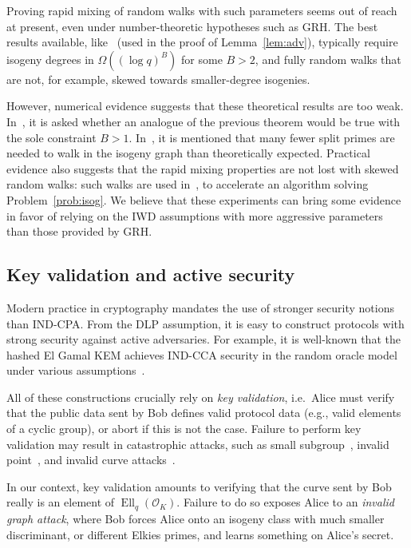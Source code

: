 \documentclass{llncs}
\renewcommand{\O}{\mathcal{O}}
\DeclareMathOperator{\Ell}{Ell}
\begin{document}
Proving rapid mixing of random walks with such
parameters seems out of reach at present, even under number-theoretic
hypotheses such as GRH. The best results available,
like~\cite[Theorem~1.5]{jao+miller+venkatesan09}
(used in the proof of Lemma~\ref{lem:adv}),
typically require isogeny degrees in $\Omega((\log q)^B)$
for some $B>2$, and fully random walks that are not,
for example, skewed towards smaller-degree isogenies.

However, numerical evidence suggests that
these theoretical results are too weak. In~\cite[7.2]{jao+miller+venkatesan09},
it is asked whether an analogue of the previous theorem would
be true with the sole constraint $B>1$. In~\cite[Section~3]{GHS},
it is mentioned that many fewer split primes are needed to walk
in the isogeny graph than theoretically expected.
Practical evidence also suggests that the rapid mixing
properties are not lost with skewed random walks:
such walks are used in~\cite{galbraith+stolbunov11},
to accelerate an algorithm solving Problem~\ref{prob:isog}.
We believe that these experiments can bring some evidence
in favor of relying on the IWD assumptions with more aggressive
parameters than those provided by GRH.


\subsection{Key validation and active security}
\label{sec:validation}

Modern practice in cryptography mandates the use of stronger security
notions than IND-CPA.  From the DLP assumption, it is easy to
construct protocols with strong security against active adversaries.
For example, it is well-known that the hashed El Gamal KEM achieves
IND-CCA security in the random oracle model under various
assumptions~\cite{10.1007/3-540-45353-9_12,cryptoeprint:1999:007,doi:10.1137/S0097539702403773}.

All of these constructions crucially rely on \emph{key validation}, 
i.e.\ Alice must verify that the public data sent by Bob defines valid
protocol data (e.g., valid elements of a cyclic group), or abort if
this is not the case.
Failure to perform key validation may result in catastrophic attacks,
such as small subgroup~\cite{10.1007/BFb0052240}, invalid
point~\cite{10.1007/3-540-44598-6_8}, and invalid curve
attacks~\cite{Ciet2005}.  

In our context, key validation amounts to
verifying that the curve sent by Bob really is an element of
$\Ell_q(\O_K)$. Failure to do so exposes Alice to an \emph{invalid
  graph attack}, where Bob forces Alice onto an isogeny class with much
smaller discriminant, or different Elkies primes, and learns something
on Alice's secret.
\end{document}
